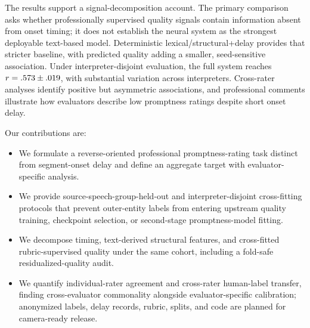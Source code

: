 The results support a signal-decomposition account. The primary comparison asks whether professionally supervised quality signals contain information absent from onset timing; it does not establish the neural system as the strongest deployable text-based model. Deterministic lexical/structural+delay provides that stricter baseline, with predicted quality adding a smaller, seed-sensitive association. Under interpreter-disjoint evaluation, the full system reaches $r=.573\pm.019$, with substantial variation across interpreters. Cross-rater analyses identify positive but asymmetric associations, and professional comments illustrate how evaluators describe low promptness ratings despite short onset delay.

Our contributions are:
\begin{itemize}
    \item We formulate a reverse-oriented professional promptness-rating task distinct from segment-onset delay and define an aggregate target with evaluator-specific analysis.
    \item We provide source-speech-group-held-out and interpreter-disjoint cross-fitting protocols that prevent outer-entity labels from entering upstream quality training, checkpoint selection, or second-stage promptness-model fitting.
    \item We decompose timing, text-derived structural features, and cross-fitted rubric-supervised quality under the same cohort, including a fold-safe residualized-quality audit.
    \item We quantify individual-rater agreement and cross-rater human-label transfer, finding cross-evaluator commonality alongside evaluator-specific calibration; anonymized labels, delay records, rubric, splits, and code are planned for camera-ready release.
\end{itemize}
